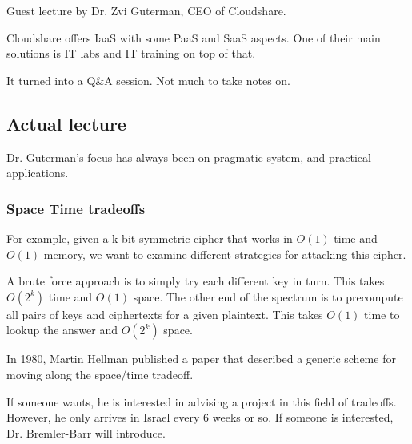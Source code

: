 \documentclass{idc_msc}
\begin{document}
Guest lecture by Dr. Zvi Guterman, CEO of Cloudshare.

Cloudshare offers IaaS with some PaaS and SaaS aspects.
One of their main solutions is IT labs and IT training on top of that.

It turned into a Q\&A session. Not much to take notes on.

\subsection{Actual lecture}

Dr. Guterman's focus has always been on pragmatic system, and practical applications.

\subsubsection{Space Time tradeoffs}

For example, given a k bit symmetric cipher that works in \(O(1)\) time and \(O(1)\) memory, we want to examine different strategies for attacking this cipher.

A brute force approach is to simply try each different key in turn.
This takes \(O(2^k)\)  time and \(O(1)\) space.
The other end of the spectrum is to precompute all pairs of keys and ciphertexts for a given plaintext.
This takes \(O(1)\) time to lookup the answer and \(O(2^k)\) space.

In 1980, Martin Hellman published a paper that described a generic scheme for moving along the space/time tradeoff.

If someone wants, he is interested in advising a project in this field of tradeoffs.
However, he only arrives in Israel every 6 weeks or so.
If someone is interested, Dr. Bremler-Barr will introduce.
\end{document}
